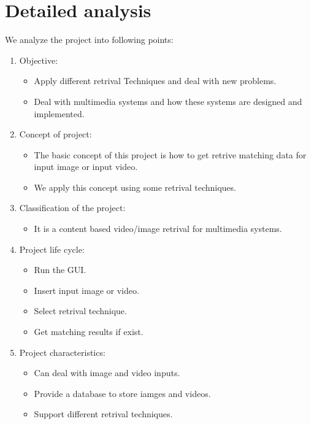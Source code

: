 \section{Detailed analysis}
We analyze the project into following points:
\begin{enumerate}
    \item Objective:
    \begin{itemize}
        \item Apply different retrival Techniques and deal with new problems.        
        \item Deal with multimedia systems and how these systems are designed and implemented.
    \end{itemize}
    \item Concept of project:
    \begin{itemize}
        \item The basic concept of this project is how to get retrive matching data for input image or input video.        
        \item We apply this concept using some retrival techniques.
    \end{itemize}
    \item Classification of the project:
    \begin{itemize}
        \item It is a content based video/image retrival for multimedia systems.        
    \end{itemize}
    \item Project life cycle:
    \begin{itemize}
        \item Run the GUI.
        \item Insert input image or video.
        \item Select retrival technique.
        \item Get matching results if exist.        
    \end{itemize}
    \vskip 0.1in
    \item Project characteristics:
    \begin{itemize}
        \item Can deal with image and video inputs.
        \item Provide a database to store iamges and videos.
        \item Support different retrival techniques.
    \end{itemize}
\end{enumerate}        
















